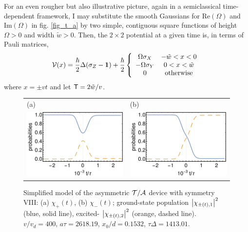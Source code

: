 For an  even rougher but also illustrative picture,  again in a semiclassical time-dependent framework, I  may substitute the smooth Gaussians for Re$(\Omega)$ and Im$(\Omega)$ in fig. \ref{fig_t_a} by two simple, contiguous square functions of height
$\Omega>0$ and width $\tilde{w} > 0$. Then, the $2\times2$ potential at a given time is, in terms of Pauli matrices,
%
\begin{eqnarray}
  {\cal V} (x) = \frac{\hbar}{2}\Delta (\sigma_Z-{\mathbf 1})+ \frac{\hbar}{2} \left\{\begin{array}{cc}
  \Omega\sigma_X & -\tilde w < x < 0\\
  -\Omega\sigma_Y & 0 < x < \tilde w\\
  0 & \mbox{otherwise}
  \end{array}\right.
\end{eqnarray}
%
where $x = \pm v t$ and let ${\sf T}=2 \tilde w/v$.

\begin{figure}
  \begin{center}
    \begin{tabular}{ll}
      (a)&(b)\\
      \includegraphics[width=0.48\linewidth]{Figures/asym_fig_t_a_approx_left.pdf}
      &
      \includegraphics[width=0.48\linewidth]{Figures/asym_fig_t_a_approx_right.pdf}
    \end{tabular}
  \end{center}
  \caption{Simplified model of the asymmetric ${\cal T/A}$ device with symmetry VIII: (a) $\chi_+(t)$, (b) $\chi_-(t)$; ground-state population $\left| \chi_{\pm(t),1} \right|^2$ (blue, solid line), excited-
  $\left| \chi_{\pm(t),2} \right|^2$ (orange, dashed line). $v/v_d = 400$, $a\tau = 2618.19$,
  $x_0/d = 0.1532$, $\tau\Delta = 1413.01$.
  \label{fig_t_a_approx}}
\end{figure}

